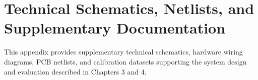 \chapter{Technical Schematics, Netlists, and Supplementary Documentation}
\label{appendix:technical_docs}

This appendix provides supplementary technical schematics, hardware wiring diagrams, PCB netlists, and calibration datasets supporting the system design and evaluation described in Chapters 3 and 4.


